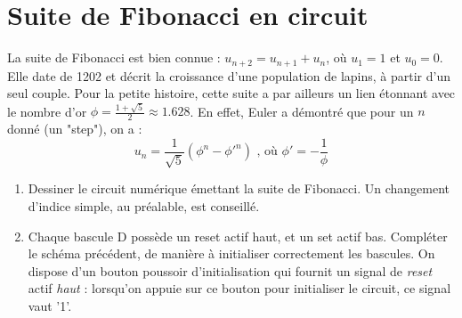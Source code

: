 \documentclass[a4paper,11pt]{article}
\begin{document}
\section{Suite de Fibonacci en circuit}
La suite de Fibonacci est bien connue : $u_{n+2}=u_{n+1}+u_{n}$, où $u_{1}=1$ et $u_0=0$.
Elle date de 1202 et décrit la croissance d'une population de lapins, à partir d'un seul couple.
Pour la petite histoire, cette suite a par ailleurs un lien étonnant avec le nombre d'or $\phi=\frac{1+\sqrt{5}}{2} \approx 1.628$.
En effet, Euler a démontré que pour un $n$ donné (un "step"), on a :
$$u_n=\frac{1}{\sqrt{5}}(\phi^n - \phi'^n) \textrm{ , où } \phi' = - \frac{1}{\phi}$$

\begin{enumerate}
  \item Dessiner le circuit numérique émettant la suite de Fibonacci. Un changement d'indice simple, au préalable, est conseillé.
  \item Chaque bascule D possède un reset actif haut, et un set actif bas. Compléter le schéma précédent, de manière à initialiser correctement les bascules. On dispose d'un bouton poussoir
  d'initialisation qui fournit un signal de {\it reset} actif {\it haut} : lorsqu'on appuie sur ce bouton pour initialiser le circuit, ce signal vaut '1'.
\end{enumerate}

\end{document}
